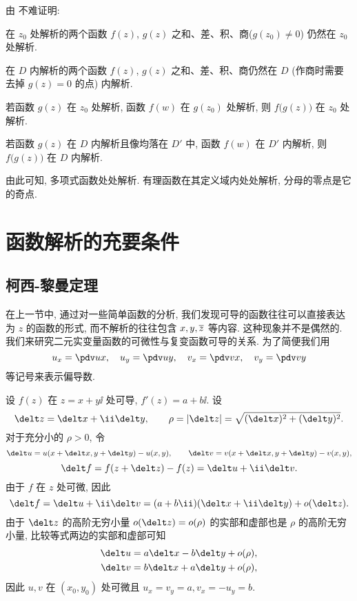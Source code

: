 由 不难证明:

\begin{theorem}
  \begin{enuma}
    \item 在 $z_0$ 处解析的两个函数 $f(z)$, $g(z)$ 之和、差、积、商($g(z_0)\neq 0$) 仍然在 $z_0$ 处解析.
    \item 在 $D$ 内解析的两个函数 $f(z)$, $g(z)$ 之和、差、积、商仍然在 $D$ (作商时需要去掉 $g(z)=0$ 的点) 内解析.
    \item 若函数 $g(z)$ 在 $z_0$ 处解析, 函数 $f(w)$ 在 $g(z_0)$ 处解析, 则 $f\bigl(g(z)\bigr)$ 在 $z_0$ 处解析.\footnotemark
    \item 若函数 $g(z)$ 在 $D$ 内解析且像均落在 $D'$ 中, 函数 $f(w)$ 在 $D'$ 内解析, 则 $f\bigl(g(z)\bigr)$ 在 $D$ 内解析.
  \end{enuma}
\end{theorem}

由此可知, 多项式函数处处解析. 有理函数在其定义域内处处解析, 分母的零点是它的奇点.



\section{函数解析的充要条件}

\subsection{柯西-黎曼定理}

在上一节中, 通过对一些简单函数的分析, 我们发现可导的函数往往可以直接表达为 $z$ 的函数的形式, 而不解析的往往包含 $x,y,\overline z$ 等内容.
这种现象并不是偶然的.
我们来研究二元实变量函数的可微性与复变函数可导的关系.
为了简便我们用
\[
  u_x=\pdv ux,\quad
  u_y=\pdv uy,\quad
  v_x=\pdv vx,\quad
  v_y=\pdv vy
\]
等记号来表示偏导数.

设 $f(z)$ 在 $z=x+y\ii$ 处可导, $f'(z)=a+b\ii$.
设
\[
  \delt z=\delt x+\ii\delt y,\qquad
  \rho=\abs{\delt z}=\sqrt{(\delt x)^2+(\delt y)^2}.
\]
对于充分小的 $\rho>0$, 令
\[
  \delt u=u(x+\delt x,y+\delt y)-u(x,y),\qquad
  \delt v=v(x+\delt x,y+\delt y)-v(x,y),
\]
\[
   \delt f
  =f(z+\delt z)-f(z)
  =\delt u+\ii\delt v.
\]
由于 $f$ 在 $z$ 处可微, 因此
\[
   \delt f
  =\delt u+\ii\delt v
  =(a+b\ii)(\delt x+\ii\delt y)+o(\delt z).
\]
由于 $\delt z$ 的高阶无穷小量 $o(\delt z)=o(\rho)$ 的实部和虚部也是 $\rho$ 的高阶无穷小量, 比较等式两边的实部和虚部可知
\begin{align*}
  \delt u&=a\delt x-b\delt y+o(\rho),\\
  \delt v&=b\delt x+a\delt y+o(\rho),
\end{align*}
因此 $u,v$ 在 $(x_0,y_0)$ 处可微且 $u_x=v_y=a,v_x=-u_y=b$.

